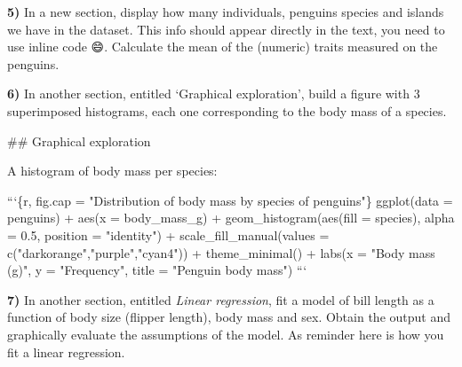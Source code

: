 \documentclass[
  12pt,
]{book}
\newenvironment{Shaded}{\begin{snugshade}}{\end{snugshade}}
\newcommand{\BaseNTok}[1]{\textcolor[rgb]{0.00,0.00,0.81}{#1}}
\newcommand{\FunctionTok}[1]{\textcolor[rgb]{0.00,0.00,0.00}{#1}}
\newcommand{\NormalTok}[1]{#1}
\begin{document}
\textbf{5)} In a new section, display how many individuals, penguins species and islands we have in the dataset. This info should appear directly in the text, you need to use inline code 😄. Calculate the mean of the (numeric) traits measured on the penguins.

\begin{Shaded}
\end{Shaded}

\textbf{6)} In another section, entitled `Graphical exploration', build a figure with 3 superimposed histograms, each one corresponding to the body mass of a species.

\begin{Shaded}
\begin{Highlighting}[]
\FunctionTok{## Graphical exploration}

\NormalTok{A histogram of body mass per species:}

\BaseNTok{```\{r, fig.cap = "Distribution of body mass by species of penguins"\}}
\BaseNTok{  ggplot(data = penguins) +}
\BaseNTok{  aes(x = body_mass_g) +}
\BaseNTok{  geom_histogram(aes(fill = species),}
\BaseNTok{                 alpha = 0.5,}
\BaseNTok{                 position = "identity") +}
\BaseNTok{  scale_fill_manual(values = c("darkorange","purple","cyan4")) +}
\BaseNTok{  theme_minimal() +}
\BaseNTok{  labs(x = "Body mass (g)",}
\BaseNTok{       y = "Frequency",}
\BaseNTok{       title = "Penguin body mass")}
\BaseNTok{```}
\end{Highlighting}
\end{Shaded}

\textbf{7)} In another section, entitled \emph{Linear regression}, fit a model of bill length as a function of body size (flipper length), body mass and sex. Obtain the output and graphically evaluate the assumptions of the model. As reminder here is how you fit a linear regression.
\end{document}
